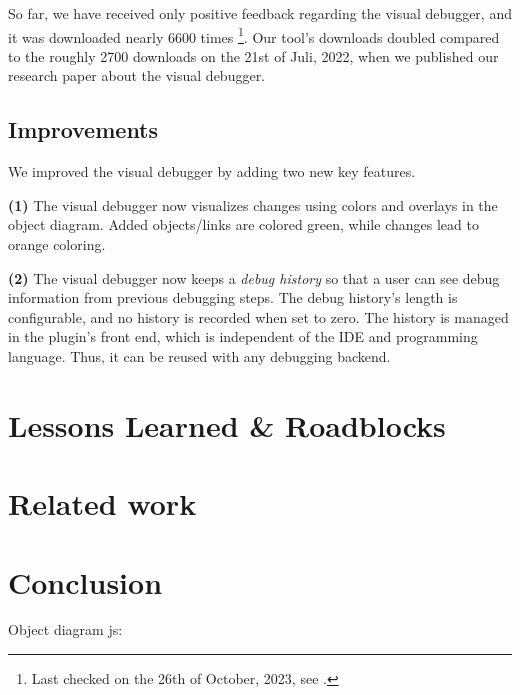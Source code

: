 \documentclass[sigconf]{acmart}
\begin{document}
So far, we have received only positive feedback regarding the visual debugger, and it was downloaded nearly 6600 times \footnote{Last checked on the 26th of October, 2023, see \cite{timkrauterVisualDebuggerIntelliJ2023}.}.
Our tool's downloads doubled compared to the roughly 2700 downloads on the 21st of Juli, 2022, when we published our research paper \cite{krauterVisualDebuggerTool2022} about the visual debugger.

\subsection{Improvements}
We improved the visual debugger by adding two new key features.

\textbf{(1)} The visual debugger now visualizes changes using colors and overlays in the object diagram.
Added objects/links are colored green, while changes lead to orange coloring.

\textbf{(2)} The visual debugger now keeps a \textit{debug history} so that a user can see debug information from previous debugging steps.
The debug history's length is configurable, and no history is recorded when set to zero.
The history is managed in the plugin's front end, which is independent of the IDE and programming language.
Thus, it can be reused with any debugging backend.


\section{Lessons Learned \& Roadblocks} \label{sec:lessonsLearned}



\section{Related work} \label{sec:relatedWork}

\section{Conclusion} \label{sec:conclusion}

Object diagram js: \cite{timkrauterObjectdiagramjs2023}




\end{document}
